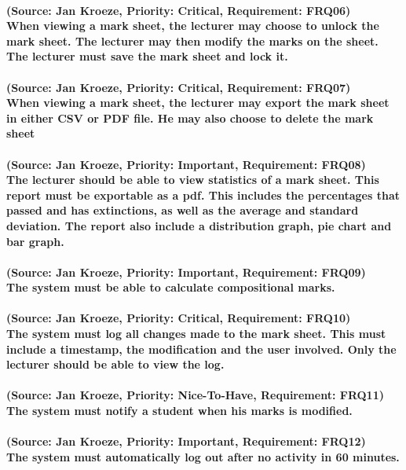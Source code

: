 \documentclass[12pt]{article}
\begin{document}
  \paragraph{(Source: Jan Kroeze, Priority: Critical, Requirement: FRQ06) \\
  When viewing a mark sheet, the lecturer may choose to unlock the mark sheet. The lecturer may then modify the marks on the sheet. The lecturer must save the mark sheet and lock it. }
  \paragraph{(Source: Jan Kroeze, Priority: Critical, Requirement: FRQ07) \\
  When viewing a mark sheet, the lecturer may export the mark sheet in either CSV or PDF file. He may also choose to delete the mark sheet}
  \paragraph{(Source: Jan Kroeze, Priority: Important, Requirement: FRQ08) \\
  The lecturer should be able to view statistics of a mark sheet.  This report must be exportable as a pdf. This includes the percentages that passed and has extinctions, as well as the average and standard deviation. The report also include a distribution graph, pie chart and bar graph.}
  \paragraph{(Source: Jan Kroeze, Priority: Important, Requirement: FRQ09) \\
  The system must be able to calculate compositional marks.}
  \paragraph{(Source: Jan Kroeze, Priority: Critical, Requirement: FRQ10) \\
  The system must log all changes made to the mark sheet. This must include a timestamp, the modification and the user involved. Only the lecturer should be able to view the log.}
  \paragraph{(Source: Jan Kroeze, Priority: Nice-To-Have, Requirement: FRQ11) \\
  The system must notify a student when his marks is modified.}
  \paragraph{(Source: Jan Kroeze, Priority: Important, Requirement: FRQ12) \\
  The system must automatically log out after no activity in 60 minutes.}
\end{document}
